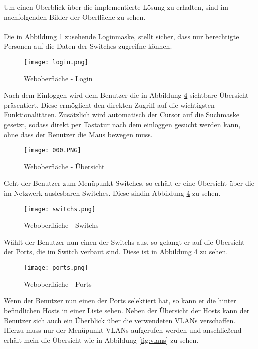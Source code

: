 \label{sec:impimgs}

Um einen Überblick über die implementierte Lösung zu erhalten, sind im nachfolgenden Bilder der Oberfläche zu sehen.\\\\
Die in Abbildung \ref{fig:login} zusehende Loginmaske, stellt sicher, dass nur berechtigte Personen auf die Daten der Switches zugreifne können.


\begin{figure}[H]
\centering
\texttt{[image: login.png]}
\caption[]{Weboberfläche - Login}
\label{fig:login}
\end{figure}

Nach dem Einloggen wird dem Benutzer die in Abbildung \ref{fig:overview} sichtbare Übersicht präsentiert.
Diese ermöglicht den direkten Zugriff auf die wichtigsten Funktionalitäten.
Zusätzlich wird automatisch der Cursor auf die Suchmaske gesetzt, sodass direkt per Tastatur nach dem einloggen gesucht werden kann, ohne dass der Benutzer die Maus bewegen muss.

\begin{figure}[H]
\centering
\texttt{[image: 000.PNG]}
\caption[]{Weboberfläche - Übersicht}
\label{fig:overview}
\end{figure}

Geht der Benutzer zum Menüpunkt Switches, so erhält er eine Übersicht über die im Netzwerk auslesbaren Switches.
Diese sindin Abbildung \ref{fig:overview} zu sehen.

\begin{figure}[H]
\centering
\texttt{[image: switchs.png]}
\caption[]{Weboberfläche - Switchs}
\label{fig:overview}
\end{figure}

Wählt der Benutzer nun einen der Switchs aus, so gelangt er auf die Übersicht der Ports, die im Switch verbaut sind.
Diese ist in Abbildung \ref{fig:overview} zu sehen.

\begin{figure}[H]
\centering
\texttt{[image: ports.png]}
\caption[]{Weboberfläche - Ports}
\label{fig:overview}
\end{figure}

Wenn der Benutzer nun einen der Ports selektiert hat, so kann er die hinter befindlichen Hosts in einer Liste sehen.
Neben der Übersicht der Hosts kann der Benutzer sich auch ein Überblick über die verwendeten VLANs verschaffen.
Hierzu muss nur der Menüpunkt VLANs aufgerufen werden und anschließend erhält mein die Übersicht wie in Abbildung \ref{fig:vlans} zu sehen.

